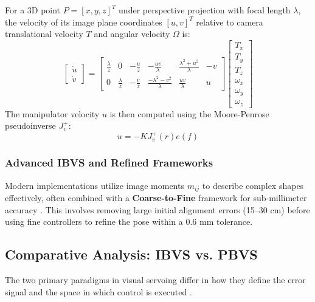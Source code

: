 \documentclass{article}
\begin{document}
For a 3D point $P = [x, y, z]^T$ under perspective projection with focal length $\lambda$, the velocity of its image plane coordinates $[u, v]^T$ relative to camera translational velocity $T$ and angular velocity $\Omega$ is:
\begin{equation}
    \begin{bmatrix} \dot{u} \\ \dot{v} \end{bmatrix} = \begin{bmatrix} \frac{\lambda}{z} & 0 & -\frac{u}{z} & -\frac{uv}{\lambda} & \frac{\lambda^2 + u^2}{\lambda} & -v \\ 0 & \frac{\lambda}{z} & -\frac{v}{z} & \frac{-\lambda^2 - v^2}{\lambda} & \frac{uv}{\lambda} & u \end{bmatrix} \begin{bmatrix} T_x \\ T_y \\ T_z \\ \omega_x \\ \omega_y \\ \omega_z \end{bmatrix}
\end{equation}
The manipulator velocity $u$ is then computed using the Moore-Penrose pseudoinverse $J_v^{+}$:
\begin{equation}
    u = -K J_v^{+}(r) e(f)
\end{equation}

\subsubsection{Advanced IBVS and Refined Frameworks}
Modern implementations utilize image moments $m_{ij}$ to describe complex shapes effectively, often combined with a \textbf{Coarse-to-Fine} framework for sub-millimeter accuracy \cite{Parisa2016, Bai2023}. This involves removing large initial alignment errors (15--30 cm) before using fine controllers to refine the pose within a 0.6 mm tolerance.

\subsection{Comparative Analysis: IBVS vs. PBVS}
The two primary paradigms in visual servoing differ in how they define the error signal and the space in which control is executed \cite{Hutchinson1996}.
\end{document}
